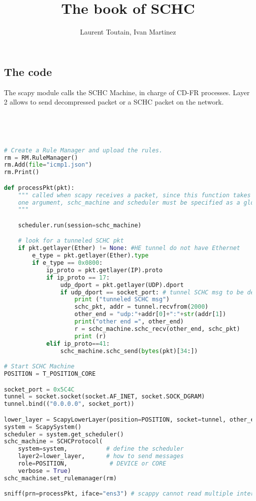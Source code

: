\documentclass[onecolumn,12pt]{book}
\title{The book of SCHC}
\author{%
  \large Laurent Toutain, Ivan Martinez
  }
\newcounter{c}
\begin{document}
\maketitle
\tableofcontents



\subsection{The code}
\label{sec:compr_code}

The scapy module calls the SCHC Machine, in charge of CD-FR processes. Layer 2 allows to send decompressed packet or a SCHC packet on the network. 

~~
\begin{lstlisting}[language=Python, basicstyle=\ttfamily\scriptsize, caption={Program ping\_core1.py}, label=prog-ping-core1]


# Create a Rule Manager and upload the rules.
rm = RM.RuleManager()
rm.Add(file="icmp1.json")
rm.Print()

def processPkt(pkt):
    """ called when scapy receives a packet, since this function takes only 
    one argument, schc_machine and scheduler must be specified as a global variable.
    """

    scheduler.run(session=schc_machine)

    # look for a tunneled SCHC pkt
    if pkt.getlayer(Ether) != None: #HE tunnel do not have Ethernet
        e_type = pkt.getlayer(Ether).type
        if e_type == 0x0800:
            ip_proto = pkt.getlayer(IP).proto
            if ip_proto == 17:
                udp_dport = pkt.getlayer(UDP).dport
                if udp_dport == socket_port: # tunnel SCHC msg to be decompressed
                    print ("tunneled SCHC msg")                    
                    schc_pkt, addr = tunnel.recvfrom(2000)
                    other_end = "udp:"+addr[0]+":"+str(addr[1])
                    print("other end =", other_end)
                    r = schc_machine.schc_recv(other_end, schc_pkt)
                    print (r)
            elif ip_proto==41:
                schc_machine.schc_send(bytes(pkt)[34:])

# Start SCHC Machine
POSITION = T_POSITION_CORE

socket_port = 0x5C4C
tunnel = socket.socket(socket.AF_INET, socket.SOCK_DGRAM)
tunnel.bind(("0.0.0.0", socket_port))

lower_layer = ScapyLowerLayer(position=POSITION, socket=tunnel, other_end=None)
system = ScapySystem()
scheduler = system.get_scheduler()
schc_machine = SCHCProtocol(
    system=system,           # define the scheduler
    layer2=lower_layer,      # how to send messages
    role=POSITION,            # DEVICE or CORE
    verbose = True)           
schc_machine.set_rulemanager(rm)

sniff(prn=processPkt, iface="ens3") # scappy cannot read multiple interfaces

\end{lstlisting}
\end{document}
